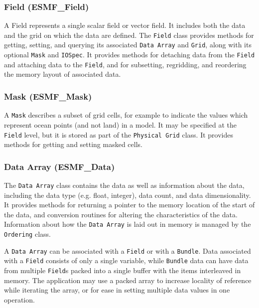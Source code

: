 \subsubsection{Field (ESMF\_Field)}
\label{sec:field} 
A Field represents a single scalar field or vector field.  It includes 
both the data and the grid on which the data are defined.  The {\tt Field}
 class provides
methods for getting, setting, and querying its associated {\tt Data Array} and {\tt Grid},
along with its optional {\tt Mask} and {\tt IOSpec}.  It provides methods for detaching 
data from the {\tt Field} and attaching data to the {\tt Field}, and for subsetting, 
regridding, and reordering the memory layout of associated data.

\subsubsection{Mask (ESMF\_Mask)}
\label{sec:mask} 
A {\tt Mask} describes a subset of grid cells, for example to indicate
the values which represent ocean points (and not land) in a model.  
It may be specified at the {\tt Field} level, but it is stored as part 
of the {\tt Physical Grid} class.  It provides methods for getting 
and setting masked cells.

\subsubsection{Data Array (ESMF\_Data)}
\label{sec:dataarray} 
The {\tt Data Array} class contains the data as well as information 
about the data, including the data type (e.g. float,
integer), data count, and data dimensionality.  
It provides methods for returning a pointer to the memory 
location of the start of the data, and conversion routines 
for altering the characteristics of the data.  
Information about how the {\tt Data Array} is laid
out in memory is managed by the {\tt Ordering} class.

A {\tt Data Array} can be associated with a {\tt Field} or with a {\tt Bundle}.
Data associated with a {\tt Field} consists of only a single variable,
while {\tt Bundle} data can have data from multiple {\tt Field}s packed 
into a single buffer with the items interleaved in memory.  
The application may use a packed array to increase
locality of reference while iterating the array, 
or for ease in setting multiple data values in one operation.


